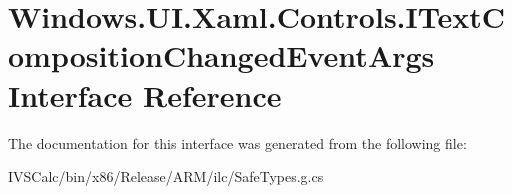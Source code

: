 \hypertarget{interface_windows_1_1_u_i_1_1_xaml_1_1_controls_1_1_i_text_composition_changed_event_args}{}\section{Windows.\+U\+I.\+Xaml.\+Controls.\+I\+Text\+Composition\+Changed\+Event\+Args Interface Reference}
\label{interface_windows_1_1_u_i_1_1_xaml_1_1_controls_1_1_i_text_composition_changed_event_args}


The documentation for this interface was generated from the following file\+:\begin{DoxyCompactItemize}
\item 
I\+V\+S\+Calc/bin/x86/\+Release/\+A\+R\+M/ilc/Safe\+Types.\+g.\+cs\end{DoxyCompactItemize}
